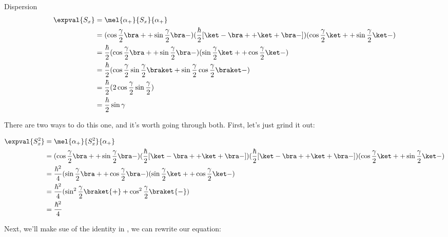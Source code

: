 \begin{answer}
\begin{answerpart}{Dispersion}
    \begin{equation}
      \begin{split}
        \expval{S_x}
        &= \mel{\alpha_+}{S_x}{\alpha_+}\\
        &= (\cos{\frac{\gamma}{2}} \bra + + \sin{\frac{\gamma}{2}} \bra -)
        (\frac{\hbar}{2} [\ket - \bra + + \ket + \bra - ])
        (\cos{\frac{\gamma}{2}} \ket + + \sin{\frac{\gamma}{2}} \ket -)\\
        &= \frac{\hbar}{2}
        (\cos{\frac{\gamma}{2}} \bra + + \sin{\frac{\gamma}{2}} \bra -)
        (\sin{\frac{\gamma}{2}} \ket + + \cos{\frac{\gamma}{2}} \ket -)\\
        &= \frac{\hbar}{2}
        (\cos{\frac{\gamma}{2}}\sin{\frac{\gamma}{2}} \braket +
        \sin{\frac{\gamma}{2}}\cos{\frac{\gamma}{2}} \braket -)\\
        &= \frac{\hbar}{2} (2\cos{\frac{\gamma}{2}}\sin{\frac{\gamma}{2}})\\
        &= \frac{\hbar}{2}\sin{\gamma}\\
      \end{split}
    \end{equation}

    There are two ways to do this one, and it's worth going through
    both.  First, let's just grind it out:
    
    \begin{equation}
      \begin{split}
        \expval{S_x^2}
        &= \mel{\alpha_+}{S_x^2}{\alpha_+}\\
        &= (\cos{\frac{\gamma}{2}} \bra + + \sin{\frac{\gamma}{2}} \bra -)
        (\frac{\hbar}{2} [\ket - \bra + + \ket + \bra - ])        
        (\frac{\hbar}{2} [\ket - \bra + + \ket + \bra - ])
        (\cos{\frac{\gamma}{2}} \ket + + \sin{\frac{\gamma}{2}} \ket -)\\
        &= \frac{\hbar^2}{4}
        (\sin{\frac{\gamma}{2}} \bra + + \cos{\frac{\gamma}{2}} \bra -)
        (\sin{\frac{\gamma}{2}} \ket + + \cos{\frac{\gamma}{2}} \ket -)\\
        &= \frac{\hbar^2}{4}
        (\sin^2{\frac{\gamma}{2}}\braket{+}
        + \cos^2{\frac{\gamma}{2}}\braket{-})\\
        &= \frac{\hbar^2}{4}
      \end{split}
    \end{equation}

    Next, we'll make sue of the identity in , we
    can rewrite our equation:


\end{answerpart}
\end{answer}
